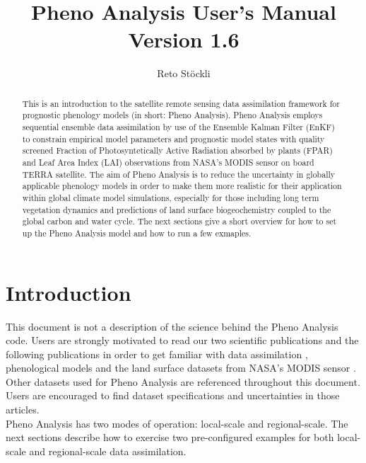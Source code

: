 \documentclass[a4paper,12pt]{article}
\title{Pheno Analysis User's Manual\\ Version 1.6}
\author{Reto St{\"o}ckli}
\begin{document}
\maketitle

\begin{center}
\end{center}
\clearpage
\tableofcontents
\clearpage

\begin{abstract}
This is an introduction to the satellite remote sensing data assimilation framework for prognostic phenology models (in short: Pheno Analysis). Pheno Analysis employs sequential ensemble data assimilation by use of the Ensemble Kalman Filter (EnKF) to constrain empirical model parameters and prognostic model states with quality screened Fraction of Photosyntetically Active Radiation absorbed by plants (FPAR) and Leaf Area Index (LAI) observations from NASA's MODIS sensor on board TERRA satellite. The aim of Pheno Analysis is to reduce the uncertainty in globally applicable phenology models in order to make them more realistic for their application within global climate model simulations, especially for those including long term vegetation dynamics and predictions of land surface biogeochemistry coupled to the global carbon and water cycle. The next sections give a short overview for how to set up the Pheno Analysis model and how to run a few exmaples.
\end{abstract}

\section{Introduction}
This document is not a description of the science behind the Pheno Analysis code. Users are strongly motivated to read our two scientific publications \citep{Stockli2008, Stockli2011} and the following publications in order to get familiar with data assimilation \citep{Anderson1999, Anderson2001, Evensen2003, Evensen2004,Ott2004, Moradkhani2005,Aksoy2006}, phenological models \citep{White1997, Chuine2000, Jolly2005} and the land surface datasets from NASA's MODIS sensor \citep{Justice2002, Friedl2002, Hall2002, Hansen2002, Huete2002, Justice2002a, Myneni2002, Schaaf2002, Vermote2002, Wan2002, Cohen2006}. Other datasets used for Pheno Analysis are referenced throughout this document. Users are encouraged to find dataset specifications and uncertainties in those articles.\\

Pheno Analysis has two modes of operation: local-scale and regional-scale. The next sections describe how to exercise two pre-configured examples for both local-scale and regional-scale data assimilation. 
\end{document}

